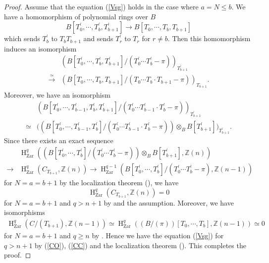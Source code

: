 \documentclass{article}
\newcommand{\Zar}{\mathrm{Zar}}
\newcommand{\HO}{\operatorname{H}}
\begin{document}
\begin{proof}
Assume that the equation (\ref{Vsg}) holds in the case where $a=N\leq b$.
We have a homomorphism of polynomial rings over $B$
%
\begin{equation*}
B[T_{0}^{\prime}, \cdots, T_{b}^{\prime}, T_{b+1}^{\prime}]
\to
B[T_{0}, \cdots, T_{b}, T_{b+1}]
\end{equation*}
%
which sends $T_{b}^{\prime}$ to $T_{b}T_{b+1}$
and sends $T_{r}^{\prime}$ to $T_{r}$ for $r\neq b$.
Then this homomorphism induces an isomorphism
%
\begin{align}\label{isofo}
&\left(
B[T_{0}^{\prime}, \cdots, T_{b}^{\prime}, T_{b+1}^{\prime}]
/(
T_{0}^{\prime}\cdots 
T_{b}^{\prime}-\pi
)
\right)_{T_{b+1}^{\prime}} \nonumber 
\\
\xrightarrow{\simeq}
&\left(
B[T_{0}, \cdots, T_{b}, T_{b+1}]
/(
T_{0}\cdots 
T_{b}\cdot T_{b+1}-\pi
)
\right)_{T_{b+1}}. 
\end{align}
%
Moreover, we have an isomorphism
%
\begin{align*}
&\left(
B[T_{0}^{\prime}, \cdots, T_{b-1}^{\prime}, T_{b}^{\prime}, T_{b+1}^{\prime}]
/(
T_{0}^{\prime}\cdots T_{b-1}^{\prime}
\cdot T_{b}^{\prime}-\pi
)
\right)_{T_{b+1}^{\prime}}  
\\
\simeq
&\bigl(
\left(
B[T_{0}^{\prime}, \cdots, T_{b-1}^{\prime}, T_{b}^{\prime}]
/(
T_{0}^{\prime}\cdots T_{b-1}^{\prime}
\cdot T_{b}^{\prime}-\pi
)
\right)
\otimes_{B}
B[T_{b+1}^{\prime}]
\bigr)_{T_{b+1}^{\prime}}.
\end{align*}
%
Since there exists an exact sequence
%
\begin{align*}
&\HO^{q}_{\Zar}\left(
(B[T_{0}^{\prime}, \cdots, T_{b}^{\prime}]/(T_{0}^{\prime}\cdots T_{b}^{\prime}-\pi))
\otimes_{B}B[T_{b+1}^{\prime}],
\mathbb{Z}(n)
\right)  \\  
\to  
&\HO^{q}_{\Zar}(
C_{T_{b+1}},
\mathbb{Z}(n)
) 
\to
\HO^{q-1}_{\Zar}(
B[T_{0}^{\prime}, \cdots, T_{b}^{\prime}]/(T_{0}^{\prime}\cdots T_{b}^{\prime}-\pi
),
\mathbb{Z}(n-1)
)
\end{align*}
%
for $N=a=b+1$
by the localization theorem (\cite[p.779, Theorem 3.2]{Ge}),
we have 
%
\begin{equation}\label{CO}
\HO^{q}_{\Zar}
(C_{T_{b+1}},
\mathbb{Z}(n)
)
=
0
\end{equation}
%
for $N=a=b+1$ and $q>n+1$ 
by 
\cite[p.781, Corollary 3.5]{Ge} 
and the assumption.
Moreover, we have isomorphisms
%
\begin{align}\label{CC}
\HO_{\Zar}^{q}(
C/(T_{b+1}),
\mathbb{Z}(n-1)
)    
\simeq
\HO^{q}_{\Zar}(
(B/(\pi))[
T_{0}, \cdots, T_{b}
],
\mathbb{Z}(n-1)
)
\simeq
0
\end{align}
%
for $N=a=b+1$ and $q\geq n$
by \cite[p.781, Corollary 3.5]{Ge}.
Hence we have the equation (\ref{Vsg}) for $q>n+1$ by
(\ref{CO}), (\ref{CC}) and the localization theorem
(\cite[p.779, Theorem 3.2]{Ge}).
This completes the proof.
\end{proof}
%
\end{document}
